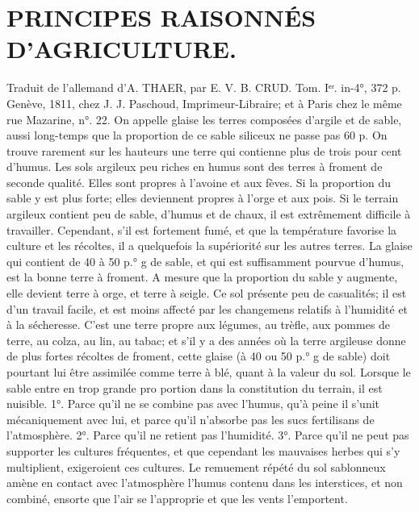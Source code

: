 \setcounter{page}{117} \section{PRINCIPES RAISONNÉS D’AGRICULTURE.}
Traduit de l’allemand d’A. THAER, par E. V. B. CRUD. Tom. Iᵉʳ. in-4°, 372 p. Genève, 1811, chez J. J. Paschoud, Imprimeur-Libraire; et à Paris chez le même rue Mazarine, n°. 22.
On appelle glaise les terres composées d’argile et de sable, aussi long-temps que la proportion de ce sable siliceux ne passe pas 60 p. %
On trouve rarement sur les hauteurs une terre qui contienne plus de trois pour cent d’humus. Les sols argileux peu riches en\setcounter{page}{118} humus sont des terres à froment de seconde qualité. Elles sont propres à l'avoine et aux fèves. Si la proportion du sable y est plus forte; elles deviennent propres à l'orge et aux pois.
Si le terrain argileux contient peu de sable, d'humus et de chaux, il est extrêmement difficile à travailler. Cependant, s'il est fortement fumé, et que la température favorise la culture et les récoltes, il a quelquefois la supériorité sur les autres terres.
La glaise qui contient de 40 à 50 p.° g de sable, et qui est suffisamment pourvue d'humus, est la bonne terre à froment. A mesure que la proportion du sable y augmente, elle devient terre à orge, et terre à seigle. Ce sol présente peu de casualités; il est d'un travail facile, et est moins affecté par les changemens relatifs à l'humidité et à la sécheresse. C'est une terre propre aux légumes, au trèfle, aux pommes de terre, au colza, au lin, au tabac; et s'il y a des années où la terre argileuse donne de plus fortes récoltes de froment, cette glaise (à 40 ou 50 p.° g de sable) doit pourtant lui être assimilée comme terre à blé, quant à la valeur du sol.
Lorsque le sable entre en trop grande pro\setcounter{page}{119} portion dans la constitution du terrain, il est nuisible.
1°. Parce qu'il ne se combine pas avec l'humus, qu'à peine il s'unit mécaniquement avec lui, et parce qu'il n'absorbe pas les sucs fertilisans de l'atmosphère.
2°. Parce qu'il ne retient pas l'humidité.
3°. Parce qu'il ne peut pas supporter les cultures fréquentes, et que cependant les mauvaises herbes qui s'y multiplient, exigeroient ces cultures. Le remuement répété du sol sablonneux amène en contact avec l'atmosphère l'humus contenu dans les interstices, et non combiné, ensorte que l'air se l'approprie et que les vents l'emportent.
